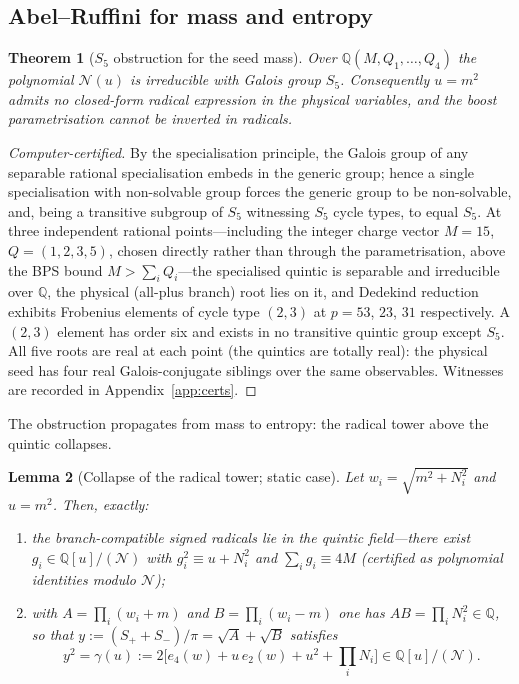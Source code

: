 \documentclass[11pt,a4paper]{article}
\newtheorem{theorem}{Theorem}[section]
\newtheorem{lemma}[theorem]{Lemma}
\theoremstyle{definition}
\theoremstyle{remark}
\newcommand{\Q}{\mathbb{Q}}
\begin{document}
\subsection{Abel--Ruffini for mass and entropy}

\begin{theorem}[\(S_5\) obstruction for the seed mass]
\label{thm:S5}
Over \(\Q(M,Q_1,\ldots,Q_4)\) the polynomial \(\mathcal N(u)\) is irreducible
with Galois group \(S_5\). Consequently \(u=m^2\) admits no closed-form radical
expression in the physical variables, and the boost parametrisation cannot be
inverted in radicals.
\end{theorem}

\begin{proof}[Computer-certified]
By the specialisation principle, the Galois group of any separable rational
specialisation embeds in the generic group; hence a single specialisation with
non-solvable group forces the generic group to be non-solvable, and, being a
transitive subgroup of \(S_5\) witnessing \(S_5\) cycle types, to equal \(S_5\).
At three independent rational points---including the integer charge vector
\(M=15\), \(Q=(1,2,3,5)\), chosen directly rather than through the
parametrisation, above the BPS bound \(M>\sum_iQ_i\)---the specialised quintic is
separable and irreducible over \(\Q\), the physical (all-plus branch) root lies
on it, and Dedekind reduction exhibits Frobenius elements of cycle type
\((2,3)\) at \(p=53\), \(23\), \(31\) respectively. A \((2,3)\) element has order
six and exists in no transitive quintic group except \(S_5\). All five roots are
real at each point (the quintics are totally real): the physical seed has four
real Galois-conjugate siblings over the same observables. Witnesses are
recorded in Appendix~\ref{app:certs}.
\end{proof}

The obstruction propagates from mass to entropy: the radical tower above the
quintic collapses.

\begin{lemma}[Collapse of the radical tower; static case]
\label{lem:collapse}
Let \(w_i=\sqrt{m^2+N_i^2}\) and \(u=m^2\). Then, exactly:
\begin{enumerate}
\item the branch-compatible signed radicals lie in the quintic field---there
exist \(g_i\in\Q[u]/(\mathcal N)\) with \(g_i^2\equiv u+N_i^2\) and
\(\sum_ig_i\equiv4M\) (certified as polynomial identities modulo
\(\mathcal N\));
\item with \(A=\prod_i(w_i+m)\) and \(B=\prod_i(w_i-m)\) one has
\(AB=\prod_iN_i^2\in\Q\), so that \(y:=(S_++S_-)/\pi=\sqrt A+\sqrt B\)
satisfies
\[
y^2=\gamma(u)
:=
2\bigl[e_4(w)+u\,e_2(w)+u^2+\textstyle\prod_iN_i\bigr]
\in\Q[u]/(\mathcal N).
\]
\end{enumerate}
\end{lemma}
\end{document}
